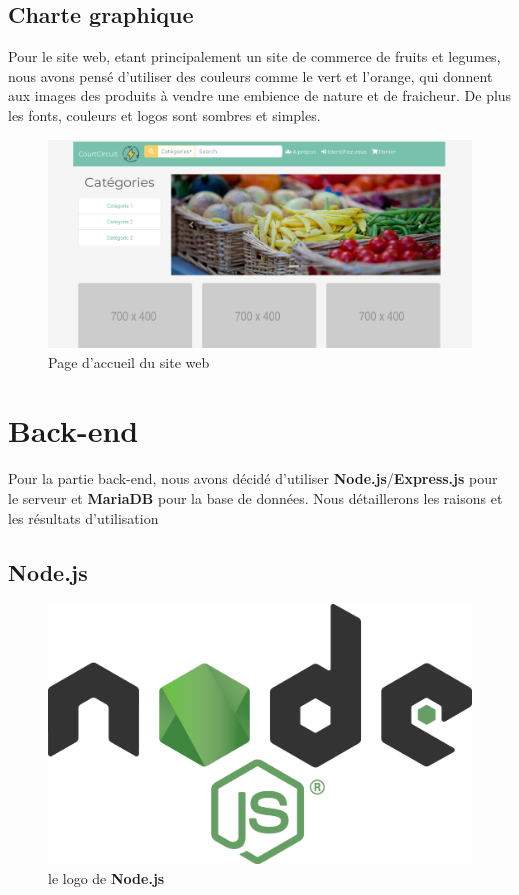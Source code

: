 \documentclass[a4paper,12pt]{report}
\theoremstyle{break}
\theoremstyle{break}
\theoremstyle{break}
\theoremstyle{break}
\theoremstyle{definition}
\theoremstyle{remark}
\begin{document}
\subsection{Charte graphique}
Pour le site web, etant principalement un site de commerce de fruits et legumes, nous avons pensé d'utiliser des couleurs comme le vert et
l'orange, qui donnent aux images des produits à vendre une embience de nature et de fraicheur. De plus les fonts, couleurs et logos sont sombres et simples.
\newpage
\begin{figure}[!ht]
  \centering
  \includegraphics[scale=0.3]{images/accueil.png}
  \caption{Page d'accueil du site web}
  \label{fig:modele_EA}
\end{figure}
\section{Back-end}
Pour la partie back-end, nous avons décidé d'utiliser \textbf{Node.js}/\textbf{Express.js} pour le serveur et \textbf{MariaDB} pour la base de données. Nous détaillerons les raisons et les résultats d'utilisation
\subsection{Node.js}
\begin{figure}[!ht]
  \centering
  \includegraphics[scale=0.05]{images/nodejs_icon.png}
  \caption{le logo de \textbf{Node.js}}
\end{figure}
\end{document}
